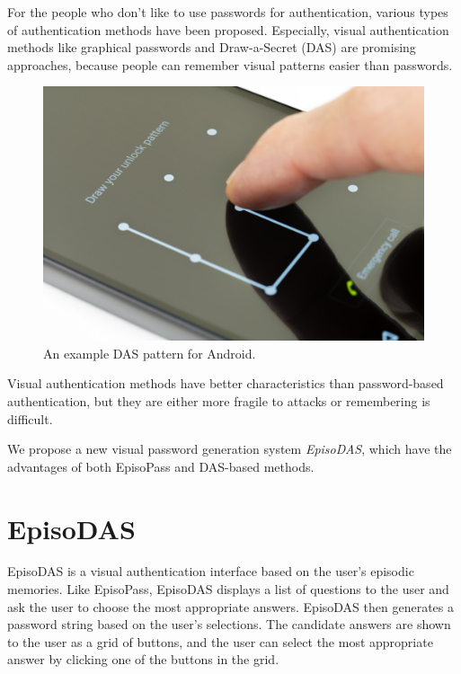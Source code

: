 \documentclass[sigconf]{acmart}
\begin{document}
For the people who don't like to use passwords for authentication,
various types of authentication methods have been proposed.
Especially, visual authentication methods
like graphical passwords\cite{Biddle:2012:GPL:2333112.2333114,GraphicalPasswords}
and Draw-a-Secret (DAS) \cite{DAS} are promising approaches, because
people can remember visual patterns easier than passwords.


\begin{figure}
  \includegraphics[width=12cm,bb=0 0 1000 667]{figures/AndroidLock.jpg}
  \caption{An example DAS pattern for Android.}
  \label{AndroidLock}
\end{figure}

Visual authentication methods have better characteristics than
password-based authentication, but
they are either more fragile to attacks
or remembering is difficult.

We propose a new visual password generation system \textit{EpisoDAS},
which have the advantages of both EpisoPass and DAS-based methods.

\section{EpisoDAS}

EpisoDAS is a visual authentication interface
based on the user's episodic memories.
Like EpisoPass,
EpisoDAS displays a list of questions to the user and
ask the user to choose the most appropriate answers.
EpisoDAS then generates a password string based on the user's selections.
%
% 
%
The candidate answers are shown to the user as a grid of buttons,
and the user can select the most appropriate answer
by clicking one of the buttons in the grid.
\end{document}

